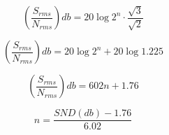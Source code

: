 \begin{equation}
(\frac{S_{rms}}{N_{rms}})db = 20\log{2^n \cdot \frac{\sqrt{3}}{\sqrt{2}}}
\label{eq7}
\end{equation}

\begin{equation}
(\frac{S_{rms}}{N_{rms}})db = 20\log{2^n} + 20\log{1.225}
\label{eq7}
\end{equation}

\begin{equation}
(\frac{S_{rms}}{N_{rms}})db = 602n + 1.76
\label{eq7}
\end{equation}

\begin{equation}
n = \frac{SND(db)-1.76}{6.02}
\end{equation}
